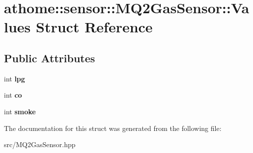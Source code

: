 \hypertarget{structathome_1_1sensor_1_1_m_q2_gas_sensor_1_1_values}{}\section{athome\+:\+:sensor\+:\+:M\+Q2\+Gas\+Sensor\+:\+:Values Struct Reference}
\label{structathome_1_1sensor_1_1_m_q2_gas_sensor_1_1_values}
\subsection*{Public Attributes}
\begin{DoxyCompactItemize}
\item 
\mbox{\label{structathome_1_1sensor_1_1_m_q2_gas_sensor_1_1_values_ab4c361d142adf2606b02abe045c9e879}} 
int {\bfseries lpg}
\item 
\mbox{\label{structathome_1_1sensor_1_1_m_q2_gas_sensor_1_1_values_afb7043620ff1fb73d8529005b84cc979}} 
int {\bfseries co}
\item 
\mbox{\label{structathome_1_1sensor_1_1_m_q2_gas_sensor_1_1_values_a2a653baf83c9be7b6e417da6ae54e769}} 
int {\bfseries smoke}
\end{DoxyCompactItemize}


The documentation for this struct was generated from the following file\+:\begin{DoxyCompactItemize}
\item 
src/M\+Q2\+Gas\+Sensor.\+hpp\end{DoxyCompactItemize}
